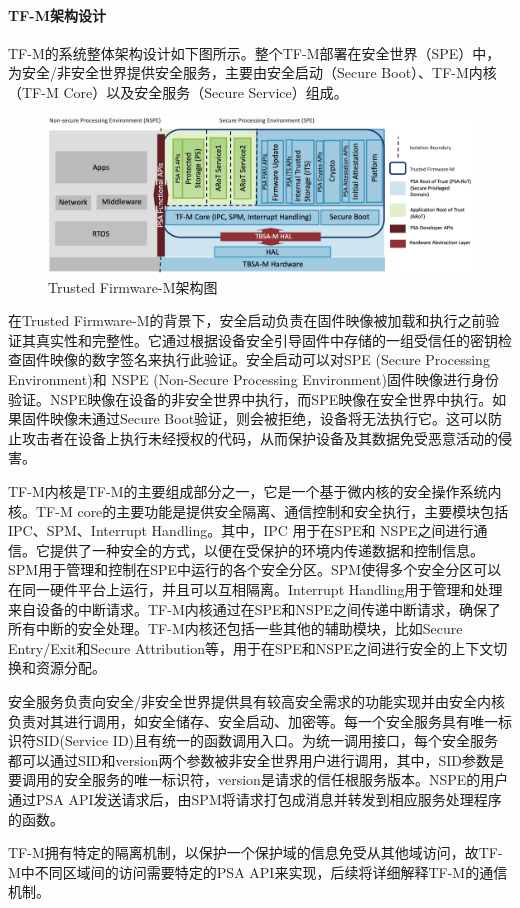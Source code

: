 \documentclass[12pt,a4paper]{ctexart}
\begin{document}
\paragraph{TF-M架构设计} TF-M的系统整体架构设计如下图所示。整个TF-M部署在安全世界（SPE）中，为安全/非安全世界提供安全服务，主要由安全启动（Secure Boot）、TF-M内核（TF-M Core）以及安全服务（Secure Service）组成。
\begin{figure}
    \centering
    \includegraphics[scale=0.2]{graph/readme_tfm_v8.png}
    \caption{Trusted Firmware-M架构图}
\end{figure}
\par 在Trusted Firmware-M的背景下，安全启动负责在固件映像被加载和执行之前验证其真实性和完整性。它通过根据设备安全引导固件中存储的一组受信任的密钥检查固件映像的数字签名来执行此验证。安全启动可以对SPE (Secure Processing Environment)和 NSPE (Non-Secure Processing Environment)固件映像进行身份验证。NSPE映像在设备的非安全世界中执行，而SPE映像在安全世界中执行。如果固件映像未通过Secure Boot验证，则会被拒绝，设备将无法执行它。这可以防止攻击者在设备上执行未经授权的代码，从而保护设备及其数据免受恶意活动的侵害。
\par TF-M内核是TF-M的主要组成部分之一，它是一个基于微内核的安全操作系统内核。TF-M core的主要功能是提供安全隔离、通信控制和安全执行，主要模块包括IPC、SPM、Interrupt Handling。其中，IPC 用于在SPE和 NSPE之间进行通信。它提供了一种安全的方式，以便在受保护的环境内传递数据和控制信息。SPM用于管理和控制在SPE中运行的各个安全分区。SPM使得多个安全分区可以在同一硬件平台上运行，并且可以互相隔离。Interrupt Handling用于管理和处理来自设备的中断请求。TF-M内核通过在SPE和NSPE之间传递中断请求，确保了所有中断的安全处理。TF-M内核还包括一些其他的辅助模块，比如Secure Entry/Exit和Secure Attribution等，用于在SPE和NSPE之间进行安全的上下文切换和资源分配。
\par 安全服务负责向安全/非安全世界提供具有较高安全需求的功能实现并由安全内核负责对其进行调用，如安全储存、安全启动、加密等。每一个安全服务具有唯一标识符SID(Service ID)且有统一的函数调用入口。为统一调用接口，每个安全服务都可以通过SID和version两个参数被非安全世界用户进行调用，其中，SID参数是要调用的安全服务的唯一标识符，version是请求的信任根服务版本。NSPE的用户通过PSA API发送请求后，由SPM将请求打包成消息并转发到相应服务处理程序的函数。
\par TF-M拥有特定的隔离机制，以保护一个保护域的信息免受从其他域访问，故TF-M中不同区域间的访问需要特定的PSA API来实现，后续将详细解释TF-M的通信机制。
\end{document}
